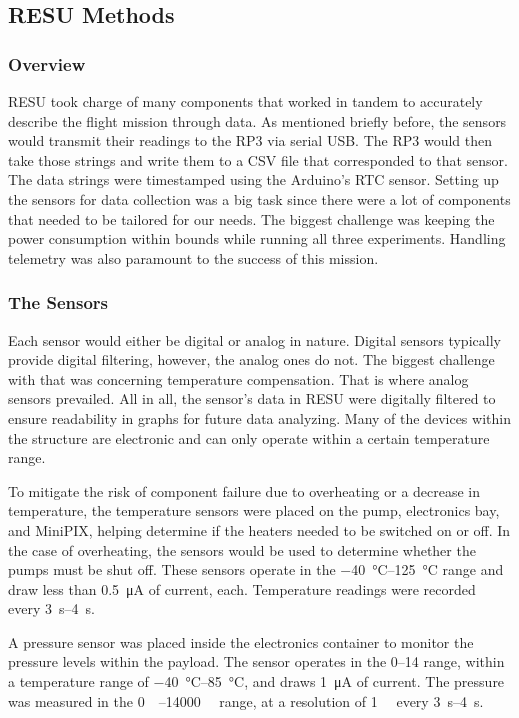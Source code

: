 \subsection{RESU Methods}
\label{sec:RESU}


\subsubsection{Overview}

RESU took charge of many components that worked in tandem to accurately describe the flight mission through data.  As mentioned briefly before, the sensors would transmit their readings to the RP3 via serial USB.  The RP3 would then take those strings and write them to a CSV file that corresponded to that sensor.  The data strings were timestamped using the Arduino's RTC sensor.  Setting up the sensors for data collection was a big task since there were a lot of components that needed to be tailored for our needs.  The biggest challenge was keeping the power consumption within bounds while running all three experiments.  Handling telemetry was also paramount to the success of this mission.

\subsubsection{The Sensors}

Each sensor would either be digital or analog in nature.  Digital sensors typically provide digital filtering, however, the analog ones do not.  The biggest challenge with that was concerning temperature compensation.  That is where analog sensors prevailed.  All in all, the sensor's data in RESU were digitally filtered to ensure readability in graphs for future data analyzing.  Many of the devices within  the structure are electronic and can only operate within a certain temperature range.
   
To mitigate the risk of component failure due to overheating or a decrease in temperature, the temperature sensors were placed on the pump, electronics bay, and MiniPIX, helping determine if the heaters needed to be switched on or off.  In the case of overheating, the sensors would be used to determine whether the pumps must be shut off.  These sensors operate in the \SIrange{-40}{125}{\celsius} range and draw less than \SI{0.5}{\micro\ampere} of current, each.  Temperature readings were recorded every \SIrange{3}{4}{\second}.

A pressure sensor was placed inside the electronics container to monitor the pressure levels within the payload.  The sensor operates in the \SIrange{0}{14}{\bara} range, within a temperature range of \SIrange{-40}{85}{\celsius}, and draws \SI{1}{\micro\ampere} of current.  The pressure was measured in the \SIrange{0}{14000}{\milli\bara} range, at a resolution of \SI{1}{\milli\bara} every \SIrange{3}{4}{\second}.

